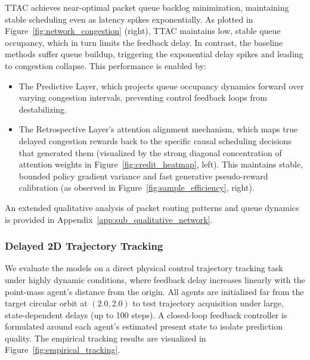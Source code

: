 \documentclass[manuscript, screen, review]{jair}
\begin{document}
TTAC achieves near-optimal packet queue backlog minimization, maintaining stable scheduling even as latency spikes exponentially. As plotted in Figure~\ref{fig:network_congestion} (right), TTAC maintains low, stable queue occupancy, which in turn limits the feedback delay. In contrast, the baseline methods suffer queue buildup, triggering the exponential delay spikes and leading to congestion collapse. This performance is enabled by:
\begin{itemize}
    \item The Predictive Layer, which projects queue occupancy dynamics forward over varying congestion intervals, preventing control feedback loops from destabilizing.
    \item The Retrospective Layer's attention alignment mechanism, which maps true delayed congestion rewards back to the specific causal scheduling decisions that generated them (visualized by the strong diagonal concentration of attention weights in Figure~\ref{fig:credit_heatmap}, left). This maintains stable, bounded policy gradient variance and fast generative pseudo-reward calibration (as observed in Figure~\ref{fig:sample_efficiency}, right).
\end{itemize}
An extended qualitative analysis of packet routing patterns and queue dynamics is provided in Appendix~\ref{app:sub_qualitative_network}.

\subsubsection{Delayed 2D Trajectory Tracking}
We evaluate the models on a direct physical control trajectory tracking task under highly dynamic conditions, where feedback delay increases linearly with the point-mass agent's distance from the origin. All agents are initialized far from the target circular orbit at $(2.0, 2.0)$ to test trajectory acquisition under large, state-dependent delays (up to 100 steps). A closed-loop feedback controller is formulated around each agent's estimated present state to isolate prediction quality. The empirical tracking results are visualized in Figure~\ref{fig:empirical_tracking}.
\end{document}
